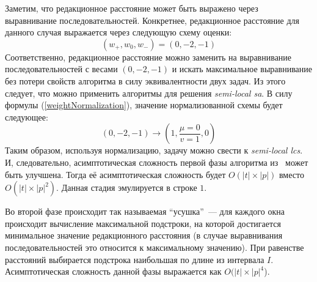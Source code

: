 Заметим, что редакционное расстояние может быть выражено через выравнивание последовательностей.
Конкретнее, редакционное расстояние для данного случая выражается через следующую схему оценки:
\begin{equation}\label{weightAppr}
    (w_{+},w_{0},w_{-}) = (0,-2,-1)
\end{equation}
Соответственно, редакционное расстояние можно заменить на выравнивание последовательностей с весами $(0,-2,-1)$ и искать максимальное выравнивание без потери свойств алгоритма в силу эквивалентности двух задач.
Из этого следует, что можно применить алгоритмы для решения \emph{semi-local sa}.
В силу  формулы (\ref{weightNormalization}), значение нормализованной схемы будет следующее:
\begin{equation}
    (0, -2, -1) \rightarrow (1,\frac{\mu=0}{v=1}, 0)
\end{equation}
Таким образом, используя нормализацию, задачу можно свести к \emph{semi-local lcs}.
И, следовательно, асимптотическая сложность первой фазы алгоритма  из~\cite{luciv2019interactive} может быть улучшена. Тогда её асимптотическая сложность будет $O(|t| \times |p|)$ вместо $O(|t| \times |p|^2)$.
Данная стадия эмулируется в строке $1$.

Во второй фазе происходит так называемая ``усушка''~--- для каждого окна происходит вычисление максимальной подстроки, на которой достигается минимальное значение редакционного расстояния (в случае выравнивания последовательностей это относится к максимальному значению).
При равенстве расстояний выбирается подстрока наибольшая по длине из интервала $I$.
Асимптотическая сложность данной фазы выражается как $O(|t| \times |p|^4$).

